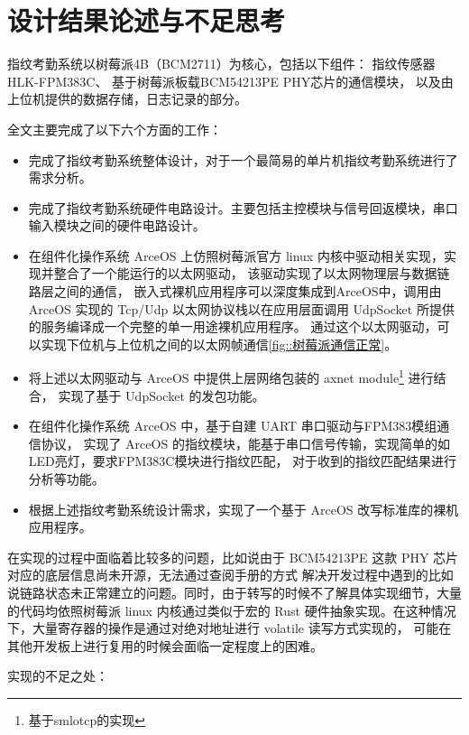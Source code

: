 \section{设计结果论述与不足思考}

    指纹考勤系统以树莓派4B（BCM2711）为核心，包括以下组件：
    指纹传感器HLK-FPM383C、
    基于树莓派板载BCM54213PE PHY芯片的通信模块，
    以及由上位机提供的数据存储，日志记录的部分。

    全文主要完成了以下六个方面的工作：

    \begin{itemize}
        \item 完成了指纹考勤系统整体设计，对于一个最简易的单片机指纹考勤系统进行了需求分析。
        \item 完成了指纹考勤系统硬件电路设计。主要包括主控模块与信号回返模块，串口输入模块之间的硬件电路设计。
        \item 在组件化操作系统 ArceOS 上仿照树莓派官方 linux 内核中驱动相关实现，实现并整合了一个能运行的以太网驱动，
            该驱动实现了以太网物理层与数据链路层之间的通信，
            嵌入式裸机应用程序可以深度集成到ArceOS中，调用由 ArceOS 实现的 Tcp/Udp 以太网协议栈以在应用层面调用 UdpSocket 所提供的服务编译成一个完整的单一用途裸机应用程序。
            通过这个以太网驱动，可以实现下位机与上位机之间的以太网帧通信\ref{fig::树莓派通信正常}。
        \item 将上述以太网驱动与 ArceOS 中提供上层网络包装的 axnet module\footnote{基于smlotcp的实现} 进行结合，
            实现了基于 UdpSocket 的发包功能。
        \item 在组件化操作系统 ArceOS 中，基于自建 UART 串口驱动与FPM383模组通信协议\cite{noauthor_fpm383c_nodate}，
            实现了 ArceOS 的指纹模块，能基于串口信号传输，实现简单的如LED亮灯，要求FPM383C模块进行指纹匹配，
            对于收到的指纹匹配结果进行分析等功能。
        \item 根据上述指纹考勤系统设计需求，实现了一个基于 ArceOS 改写标准库的裸机应用程序。
    \end{itemize}

    在实现的过程中面临着比较多的问题，比如说由于 BCM54213PE 这款 PHY 芯片对应的底层信息尚未开源，无法通过查阅手册的方式
    解决开发过程中遇到的比如说链路状态未正常建立的问题。同时，由于转写的时候不了解具体实现细节，大量的代码均依照树莓派 linux
    内核通过类似于宏的 Rust 硬件抽象实现。在这种情况下，大量寄存器的操作是通过对绝对地址进行 volatile 读写方式实现的，
    可能在其他开发板上进行复用的时候会面临一定程度上的困难。

    实现的不足之处：

